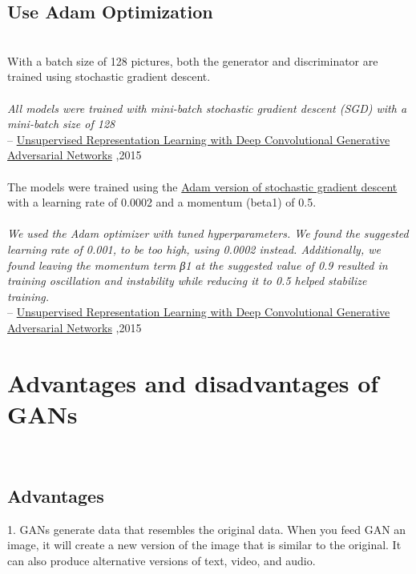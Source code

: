 \documentclass[14pt]{article}
\begin{document}
\subsection{Use Adam Optimization}
\\ 
With a batch size of 128 pictures, both the generator and discriminator are trained using stochastic gradient descent.
\\ \\ 
\hspace*{1cm} \textit{All models were trained with mini-batch stochastic gradient descent (SGD) with a mini-batch size of 128}\\ 
\hspace*{4cm} --
\hyperlink{https://arxiv.org/abs/1511.06434}{Unsupervised Representation Learning with Deep Convolutional Generative Adversarial Networks} ,2015
\\ \\
The models were trained using the \hyperlink{https://machinelearningmastery.com/adam-optimization-algorithm-for-deep-learning/}{Adam version of stochastic gradient descent} with a learning rate of 0.0002 and a momentum (beta1) of 0.5.
\\ \\ 
\hspace*{1cm} \textit{We used the Adam optimizer with tuned hyperparameters. We found the suggested learning rate of 0.001, to be too high, using 0.0002 instead. Additionally, we found leaving the momentum term β1 at the suggested value of 0.9 resulted in training oscillation and instability while reducing it to 0.5 helped stabilize training.}\\ 
\hspace*{4cm} --
\hyperlink{https://arxiv.org/abs/1511.06434}{Unsupervised Representation Learning with Deep Convolutional Generative Adversarial Networks} ,2015
\\ 
\section{Advantages and disadvantages of GANs }\\
\subsection{Advantages}
1. GANs generate data that resembles the original data. When you feed GAN an image, it will create a new version of the image that is similar to the original. It can also produce alternative versions of text, video, and audio.
\end{document}
